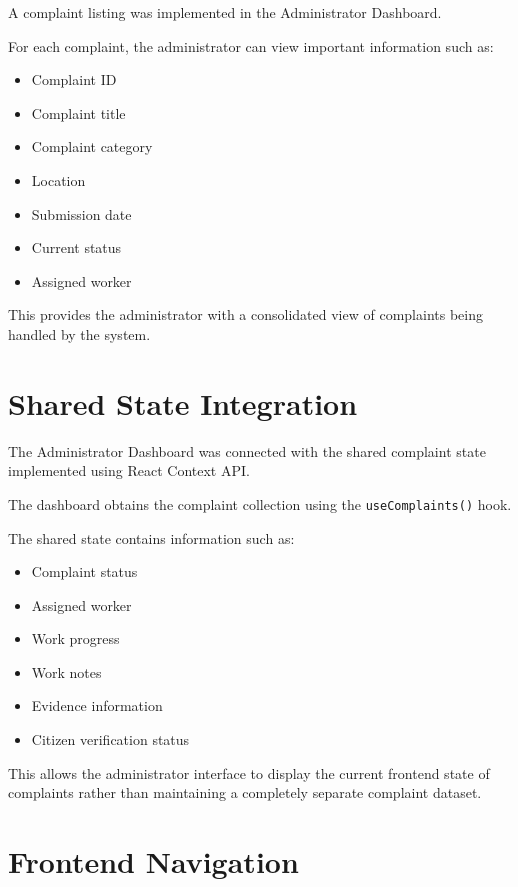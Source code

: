 \documentclass[12pt,a4paper]{article}
\begin{document}
A complaint listing was implemented in the Administrator Dashboard.

For each complaint, the administrator can view important information such
as:

\begin{itemize}
    \item Complaint ID
    \item Complaint title
    \item Complaint category
    \item Location
    \item Submission date
    \item Current status
    \item Assigned worker
\end{itemize}

This provides the administrator with a consolidated view of complaints
being handled by the system.

\section{Shared State Integration}

The Administrator Dashboard was connected with the shared complaint state
implemented using React Context API.

The dashboard obtains the complaint collection using the
\texttt{useComplaints()} hook.

The shared state contains information such as:

\begin{itemize}
    \item Complaint status
    \item Assigned worker
    \item Work progress
    \item Work notes
    \item Evidence information
    \item Citizen verification status
\end{itemize}

This allows the administrator interface to display the current frontend
state of complaints rather than maintaining a completely separate complaint
dataset.

\section{Frontend Navigation}
\end{document}
